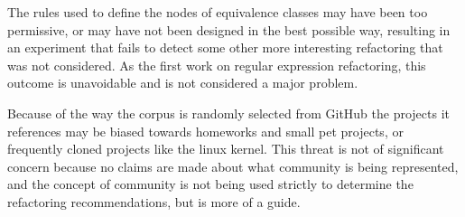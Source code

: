 The rules used to define the nodes of equivalence classes may have been too permissive, or may have not been designed in the best possible way, resulting in an experiment that fails to detect some other more interesting refactoring that was not considered.  As the first work on regular expression refactoring, this outcome is unavoidable and is not considered a major problem.

Because of the way the corpus is randomly selected from GitHub the projects it references may be biased towards homeworks and small pet projects, or frequently cloned projects like the linux kernel.  This threat is not of significant concern because no claims are made about what community is being represented, and the concept of community is not being used strictly to determine the refactoring recommendations, but is more of a guide.
